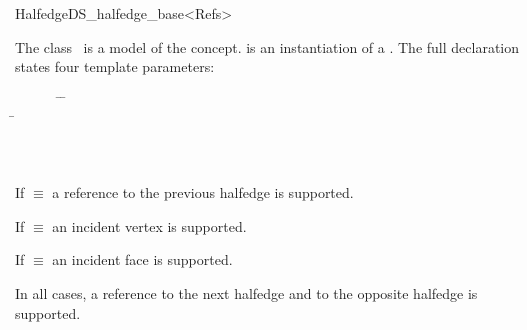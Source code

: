 
\ccRefPageBegin



\begin{ccRefClass}{HalfedgeDS_halfedge_base<Refs>}

\ccDefinition
  
The class \ccRefName\ is a model of the 
concept.  is an instantiation of a . 
The full declaration states four template parameters:

\begin{tabbing}
\mbox{}~~~~~~ \=  \=\\
              \> \> \=\\
              \> \> \>\\
              \> \> \>\\
     \> 
\end{tabbing}

If  $\equiv$  a reference to the previous
halfedge is supported.

If  $\equiv$  an incident vertex is
supported.

If  $\equiv$  an incident face is
supported.

In all cases, a reference to the next halfedge and to the opposite
halfedge is supported.


\ccIsModel


\ccCreation
{}



\end{ccRefClass}
